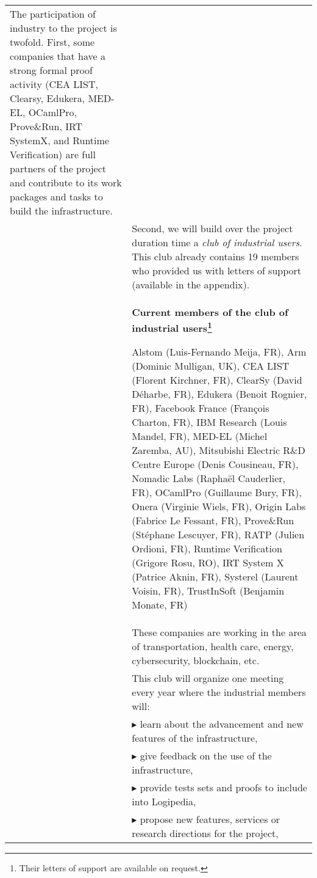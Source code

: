 \begin{longtable}{|p{}|p{}|}
The participation of industry to the project is twofold. First,
some companies that have a strong formal proof activity (CEA
LIST, Clearsy, Edukera, MED-EL, OCamlPro, Prove\&Run, IRT SystemX,
and Runtime Verification) are full partners of the project and
contribute to its work packages and tasks to build the
infrastructure.
\\
&
\hspace{0.4cm}
Second, we will build over the project duration time a {\em club of
  industrial users}. This club already contains
19 members who provided us with letters of support (available in the appendix).
\\
&
\hspace{0.4cm}
\definecolor{shadecolor}{named}{color1}
\begin{shaded}
\begin{center}
  {\bf\large Current members of the club of industrial users\footnote{Their letters of support are available on request.}}
\end{center}
Alstom (Luis-Fernando Meija, FR),
Arm (Dominic Mulligan, UK),
CEA LIST (Florent Kirchner, FR),
ClearSy (David Déharbe, FR),
Edukera (Benoit Rognier, FR),
Facebook France (François Charton, FR),
IBM Research (Louis Mandel, FR),
MED-EL (Michel Zaremba, AU),
Mitsubishi Electric R\&D Centre Europe (Denis Cousineau, FR),
Nomadic Labs (Raphaël Cauderlier, FR),
OCamlPro (Guillaume Bury, FR),
Onera (Virginie Wiels, FR),
Origin Labs (Fabrice Le Fessant, FR),
Prove\&Run (Stéphane Lescuyer, FR),
RATP (Julien Ordioni, FR),
Runtime Verification (Grigore Rosu, RO),
IRT System X (Patrice Aknin, FR),
Systerel (Laurent Voisin, FR),
TrustInSoft (Benjamin Monate, FR)
\end{shaded}\\
&
\hspace{0.4cm}
These companies are working in the area of transportation, health
care, energy, cybersecurity, blockchain, etc.
\\
&
\hspace{0.4cm}
This club will organize one meeting every year where the
industrial members will:\\
&
$\blacktriangleright$
learn about the advancement and new features of the infrastructure,\\
&
$\blacktriangleright$
give feedback on the use of the infrastructure,
\\
&
$\blacktriangleright$ provide tests sets and proofs to include into Logipedia,
\\
&
$\blacktriangleright$ propose new features, services or research directions for the project,

\end{longtable}
